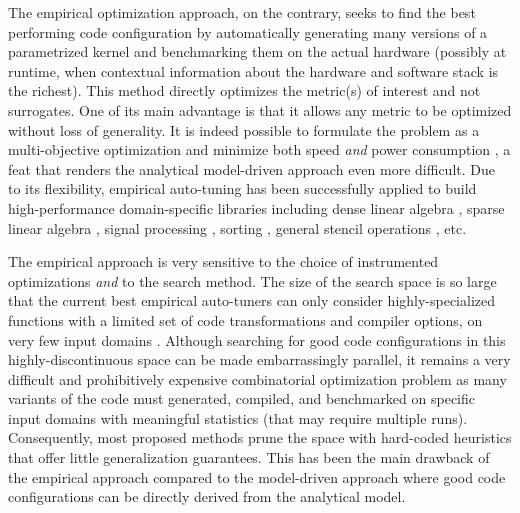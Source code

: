 \documentclass{sig-alternate}
\begin{document}

The empirical optimization approach, on the contrary, seeks to find the best
performing code configuration by automatically generating many versions of a
parametrized kernel and benchmarking them on the actual hardware (possibly at
runtime, when contextual information about the hardware and software stack is
the richest). This method directly optimizes the metric(s) of interest and not
surrogates. One of its main advantage is that it allows any metric to be
optimized without loss of generality. It is indeed possible to formulate the
problem as a multi-objective optimization and minimize both speed \emph{and}
power consumption \citep{rahman2011automated}, a feat that renders the
analytical model-driven approach even more difficult. Due to its flexibility,
empirical auto-tuning has been successfully applied to build high-performance
domain-specific libraries including dense linear algebra
\citep{clint2001automated, bilmes1997optimizing}, sparse linear algebra
\citep{vuduc2005oski}, signal processing \citep{frigo1998fftw}, sorting
\citep{li2004dynamically}, general stencil operations \citep{kamil2010auto}, etc.

The empirical approach is very sensitive to the choice of instrumented
optimizations \emph{and} to the search method. The size of the search space is
so large that the current best empirical auto-tuners can only consider
highly-specialized functions with a limited set of code transformations and
compiler options, on very few input domains \citep{ganapathi2009case}. Although
searching for good code configurations in this highly-discontinuous space can
be made embarrassingly parallel, it remains a very difficult and prohibitively
expensive combinatorial optimization problem as many variants of the code must
generated, compiled, and benchmarked on specific input domains with meaningful
statistics (that may require multiple runs). Consequently, most proposed
methods prune the space with hard-coded heuristics that offer little
generalization guarantees. This has been the main drawback of the empirical
approach compared to the model-driven approach where good code configurations
can be directly derived from the analytical model.
\end{document}
